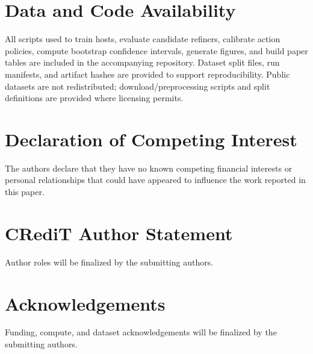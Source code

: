 \documentclass[preprint,12pt]{elsarticle}
\begin{document}
\section*{Data and Code Availability}

All scripts used to train hosts, evaluate candidate refiners, calibrate action
policies, compute bootstrap confidence intervals, generate figures, and build
paper tables are included in the accompanying repository. Dataset split files,
run manifests, and artifact hashes are provided to support reproducibility.
Public datasets are not redistributed; download/preprocessing scripts and split
definitions are provided where licensing permits.

\section*{Declaration of Competing Interest}

The authors declare that they have no known competing financial interests or
personal relationships that could have appeared to influence the work reported
in this paper.

\section*{CRediT Author Statement}

Author roles will be finalized by the submitting authors.

\section*{Acknowledgements}

Funding, compute, and dataset acknowledgements will be finalized by the
submitting authors.



\end{document}
